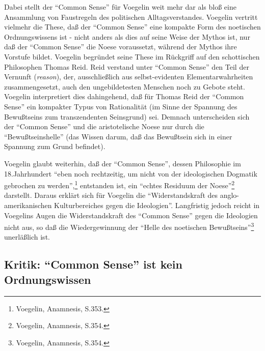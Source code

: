 Dabei stellt der "`Common Sense"' für Voegelin weit mehr dar als bloß eine
Ansammlung von Faustregeln des politischen Alltagsverstandes. Voegelin
vertritt vielmehr die These, daß der "`Common Sense"' eine kompakte Form
des noetischen Ordnungswissens ist - nicht anders als dies auf seine Weise der
Mythos ist, nur daß der "`Common Sense"' die Noese voraussetzt, während der
Mythos ihre Vorstufe bildet. Voegelin begründet seine These im Rückgriff auf
den schottischen Philosophen Thomas Reid. Reid verstand unter "`Common Sense"'
den Teil der Vernunft ({\it reason}), der, ausschließlich aus selbst-evidenten
Elementarwahrheiten zusammengesetzt, auch den ungebildetesten Menschen noch zu
Gebote steht. Voegelin interpretiert dies dahingehend, daß für Thomas Reid der
"`Common Sense"' ein kompakter Typus von Rationalität (im Sinne der Spannung
des Bewußtseins zum transzendenten Seinsgrund) sei. Demnach unterscheiden sich
der "`Common Sense"' und die aristotelische Noese nur durch die
"`Bewußtseinshelle"' (das Wissen darum, daß das Bewußtsein sich in einer
Spannung zum Grund befindet).

Voegelin glaubt weiterhin, daß der "`Common Sense"', dessen Philosophie im
18.Jahrhundert "`eben noch rechtzeitig, um nicht von der ideologischen
Dogmatik gebrochen zu werden"',\footnote{Voegelin, Anamnesis, S.353.}
entstanden ist, ein "`echtes Residuum der Noese"'\footnote{Voegelin,
  Anamnesis, S.354.} darstellt. Daraus erklärt sich für Voegelin die
"`Widerstandskraft des anglo-amerikanischen Kulturbereiches gegen die
Ideologien"'. Langfristig jedoch reicht in Voegelins Augen die
Widerstandskraft des "`Common Sense"' gegen die Ideologien nicht aus, so daß
die Wiedergewinnung der "`Helle des noetischen
Bewußtseins"'\footnote{Voegelin, Anamnesis, S.354.} unerläßlich ist.
  
\subsection{Kritik: "`Common Sense"' ist kein Ordnungswissen}

